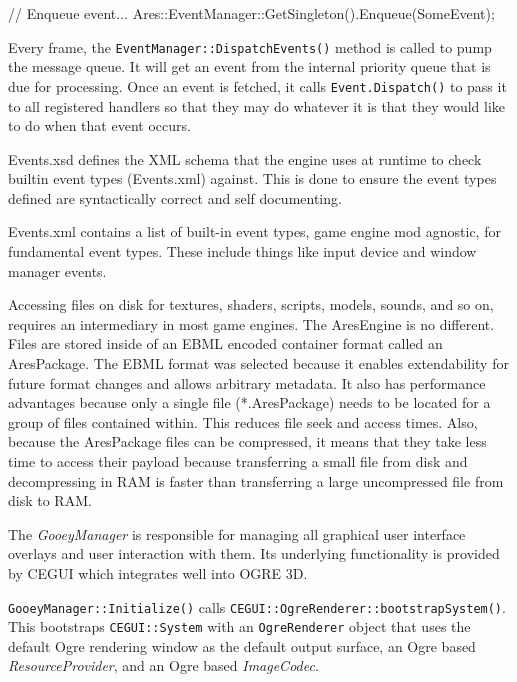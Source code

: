 // Enqueue event...
Ares::EventManager::GetSingleton().Enqueue(SomeEvent);
\stoptyping
\StopCodeExample

Every frame, the {\tt EventManager::DispatchEvents()} method is called to pump the message queue. It will get an event from the internal priority queue that is due for processing. Once an event is fetched, it calls {\tt Event.Dispatch()} to pass it to all registered handlers so that they may do whatever it is that they would like to do when that event occurs.

Events.xsd defines the XML schema that the engine uses at runtime to check builtin event types (Events.xml) against. This is done to ensure the event types defined are syntactically correct and self documenting.

Events.xml contains a list of built-in event types, game engine mod agnostic, for fundamental event types. These include things like input device and window manager events.

    {}

\page 
{}
Accessing files on disk for textures, shaders, scripts, models, sounds, and so on, requires an intermediary in most game engines. The AresEngine is no different. Files are stored inside of an EBML encoded container format called an AresPackage. The EBML format was selected because it enables extendability for future format changes and allows arbitrary metadata. It also has performance advantages because only a single file (*.AresPackage) needs to be located for a group of files contained within. This reduces file seek and access times. Also, because the AresPackage files can be compressed, it means that they take less time to access their payload because transferring a small file from disk and decompressing in RAM is faster than transferring a large uncompressed file from disk to RAM.

    {}

\page 
{}
The {\it GooeyManager} is responsible for managing all graphical user interface overlays and user interaction with them. Its underlying functionality is provided by CEGUI which integrates well into OGRE 3D.

{\tt GooeyManager::Initialize()} calls {\tt CEGUI::OgreRenderer::bootstrapSystem()}. This bootstraps {\tt CEGUI::System} with an {\tt OgreRenderer} object that uses the default Ogre rendering window as the default output surface, an Ogre based {\it ResourceProvider}, and an Ogre based {\it ImageCodec}.

